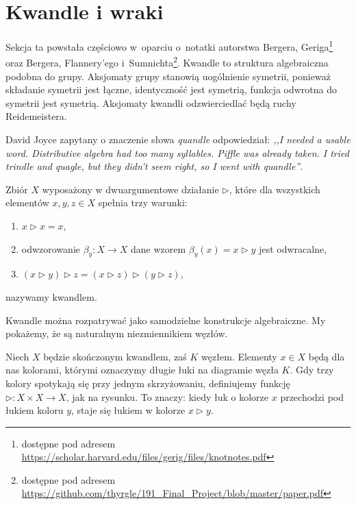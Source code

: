 
\section{Kwandle i wraki}
%

Sekcja ta powstała częściowo w~oparciu o~notatki autorstwa Bergera, Geriga\footnote{dostępne pod adresem \url{https://scholar.harvard.edu/files/gerig/files/knotnotes.pdf}} oraz Bergera, Flannery'ego i~Sumnichta\footnote{dostępne pod adresem \url{https://github.com/thyrgle/191_Final_Project/blob/master/paper.pdf}}.
%
%
%
%
Kwandle to struktura algebraiczna podobna do grupy.
Aksjomaty grupy stanowią uogólnienie symetrii, ponieważ składanie symetrii jest łączne, identyczność jest symetrią, funkcja odwrotna do symetrii jest symetrią.
Aksjomaty kwandli odzwierciedlać będą ruchy Reidemeistera.
%

David Joyce zapytany o znaczenie słowa \emph{quandle} odpowiedział: \emph{,,I needed a usable word. Distributive algebra had too many syllables. Piffle was already taken. I tried trindle and quagle, but they didn’t seem right, so I went with quandle''}.
%

\begin{definition}[kwandel]
%
    Zbiór $X$ wyposażony w dwuargumentowe działanie $\triangleright$, które dla wszystkich elementów $x, y, z \in X$ spełnia trzy warunki:
    \begin{enumerate}
        \item $x \triangleright x = x$,
        \item odwzorowanie $\beta_y \colon X \to X$ dane wzorem $\beta_y(x) = x \triangleright y$ jest odwracalne,
        \item $(x \triangleright y) \triangleright z = (x \triangleright z) \triangleright (y \triangleright z)$,
    \end{enumerate}
    nazywamy kwandlem.
\end{definition}

Kwandle można rozpatrywać jako samodzielne konstrukcje algebraiczne.
My pokażemy, że są naturalnym niezmiennikiem węzłów.

Niech $X$ będzie skończonym kwandlem, zaś $K$ węzłem.
Elementy $x \in X$ będą dla nas kolorami, którymi oznaczymy długie łuki na diagramie węzła $K$.
Gdy trzy kolory spotykają się przy jednym skrzyżowaniu, definiujemy funkcję $\triangleright \colon X \times X \to X$, jak na rysunku.
To znaczy: kiedy łuk o kolorze $x$ przechodzi pod łukiem koloru $y$, staje się łukiem w kolorze $x \triangleright y$.
\begin{comment}
\[
    \LargeMinusCrossingQuandle
\]
\end{comment}

